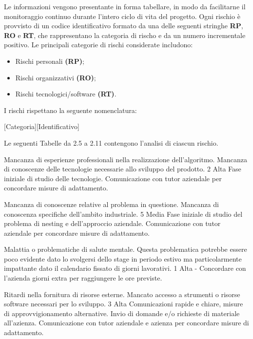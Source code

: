 Le informazioni vengono presentante in forma tabellare, in modo da facilitarne il monitoraggio continuo durante l’intero ciclo di vita del progetto. Ogni rischio è provvisto di un codice identificativo formato da una delle seguenti stringhe \textbf{RP}, \textbf{RO} e \textbf{RT}, che rappresentano la categoria di rischo e da un numero incrementale positivo. Le principali categorie di rischi considerate includono:
\begin{itemize}
    \item Rischi personali \textbf{(RP)};
    \item Rischi organizzativi \textbf{(RO)};
    \item Rischi tecnologici/software \textbf{(RT)}.
\end{itemize}
I rischi rispettano la seguente nomenclatura:
\begin{center}
    [Categoria][Identificativo]
\end{center}

Le seguenti Tabelle da 2.5 a 2.11 contengono l'analisi di ciascun rischio.

{Mancanza di esperienze professionali nella realizzazione dell'algoritmo. Mancanza di conoscenze delle tecnologie necessarie allo sviluppo del prodotto.}
{2}
{Alta}
{Fase iniziale di studio delle tecnologie.}
{Comunicazione con tutor aziendale per concordare misure di adattamento.}

{Mancanza di conoscenze relative al problema in questione. Mancanza di conoscenza specifiche dell'ambito industriale.}
{5}
{Media}
{Fase iniziale di studio del problema di nesting e dell'approccio aziendale.}
{Comunicazione con tutor aziendale per concordare misure di adattamento.}

{Malattia o problematiche di salute mentale. Questa problematica potrebbe essere poco evidente dato lo svolgersi dello stage in periodo estivo ma particolarmente impattante dato il calendario fissato di giorni lavorativi.}
{1}
{Alta}
{-}
{Concordare con l'azienda giorni extra per raggiungere le ore previste.}

{Ritardi nella fornitura di risorse esterne. Mancato accesso a strumenti o risorse software necessari per lo sviluppo.}
{3}
{Alta}
{Comunicazioni rapide e chiare, misure di approvvigionamento alternative. Invio di domande e/o richieste di materiale all'azienza.}
{Comunicazione con tutor aziendale e azienza per concordare misure di adattamento.}

